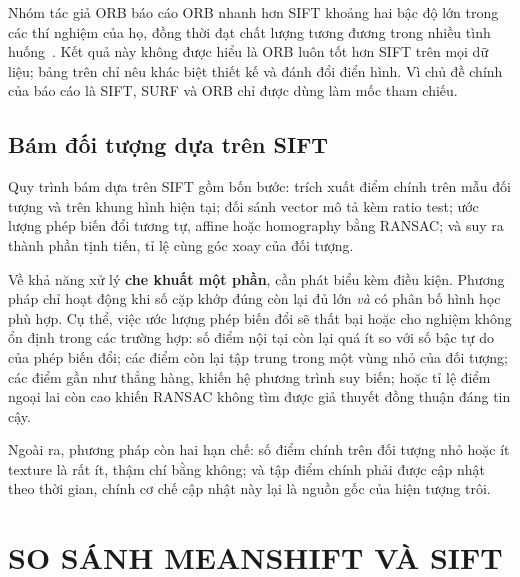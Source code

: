 \documentclass[12pt,a4paper]{article}
\numberwithin{equation}{section}
\begin{document}
Nhóm tác giả ORB báo cáo ORB nhanh hơn SIFT khoảng hai bậc độ lớn trong các thí nghiệm của
họ, đồng thời đạt chất lượng tương đương trong nhiều tình huống~\cite{rublee2011}. Kết quả này
không được hiểu là ORB luôn tốt hơn SIFT trên mọi dữ liệu; bảng trên chỉ nêu khác biệt thiết kế và
đánh đổi điển hình. Vì chủ đề chính của báo cáo là SIFT, SURF và ORB chỉ được dùng làm mốc tham
chiếu.

\subsection{Bám đối tượng dựa trên SIFT}

Quy trình bám dựa trên SIFT gồm bốn bước: trích xuất điểm chính trên mẫu đối tượng và trên khung
hình hiện tại; đối sánh vector mô tả kèm ratio test; ước lượng phép biến đổi tương tự, affine hoặc
homography bằng RANSAC; và suy ra thành phần tịnh tiến, tỉ lệ cùng góc xoay của đối tượng.

Về khả năng xử lý \textbf{che khuất một phần}, cần phát biểu kèm điều kiện. Phương pháp chỉ hoạt
động khi số cặp khớp đúng còn lại đủ lớn \textit{và} có phân bố hình học phù hợp. Cụ thể, việc ước
lượng phép biến đổi sẽ thất bại hoặc cho nghiệm không ổn định trong các trường hợp: số điểm nội
tại còn lại quá ít so với số bậc tự do của phép biến đổi; các điểm còn lại tập trung trong một
vùng nhỏ của đối tượng; các điểm gần như thẳng hàng, khiến hệ phương trình suy biến; hoặc tỉ lệ
điểm ngoại lai còn cao khiến RANSAC không tìm được giả thuyết đồng thuận đáng tin cậy.

Ngoài ra, phương pháp còn hai hạn chế: số điểm chính trên đối tượng nhỏ hoặc ít texture là rất ít,
thậm chí bằng không; và tập điểm chính phải được cập nhật theo thời gian, chính cơ chế cập nhật
này lại là nguồn gốc của hiện tượng trôi.

\section{SO SÁNH MEANSHIFT VÀ SIFT}
\end{document}

